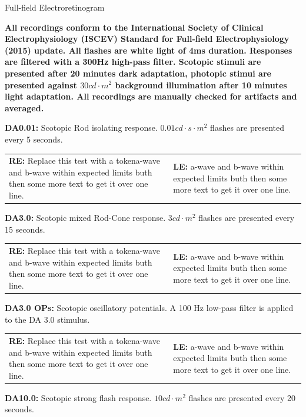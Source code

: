 \documentclass[12pt]{article}
\newenvironment{heading}
{\begin{flushleft}
	 \begin{large}
	\bfseries
}
{\end{large}
	\end{flushleft}
}
\newenvironment{boxed}
{\noindent\begin{lrbox}{\mybox}\begin{minipage}{\textwidth}}
{\end{minipage}\end{lrbox}\fbox{\usebox{\mybox}}}
\begin{document}
\begin{boxed}
\begin{heading}
Full-field Electroretinogram
\end{heading}

{\footnotesize{\textbf{All recordings conform to the International Society of Clinical Electrophysiology (ISCEV) Standard for Full-field Electrophysiology (2015) update. All flashes are white light of 4ms duration. Responses are filtered with a 300Hz high-pass filter. Scotopic stimuli are presented after 20 minutes dark adaptation, photopic stimui are presented against $30 cd{\cdot}m^2$ background illumination after 10 minutes light adaptation. All recordings are manually checked for artifacts and averaged.}}}\newline

\textbf{DA0.01:} Scotopic Rod isolating response. $0.01 cd{\cdot}s{\cdot}m^2$ flashes are presented every 5 seconds.\newline
		\begin{tabularx}{\linewidth}{X X}
			\textbf{RE:} Replace this test with a tokena-wave and b-wave within expected limits buth then some more text to get it over one line. & \textbf{LE:} a-wave and b-wave within expected limits buth then some more text to get it over one line.\\
		\end{tabularx}
\textbf{DA3.0:} Scotopic mixed Rod-Cone response. $3 cd{\cdot}m^2$ flashes are presented every 15 seconds.\newline
		\begin{tabularx}{\linewidth}{X X}
			\textbf{RE:} Replace this test with a tokena-wave and b-wave within expected limits buth then some more text to get it over one line. & \textbf{LE:} a-wave and b-wave within expected limits buth then some more text to get it over one line.\\
		\end{tabularx}
\textbf{DA3.0 OPs:} Scotopic oscillatory potentials. A 100 Hz low-pass filter is applied to the DA 3.0 stimulus.\newline
		\begin{tabularx}{\linewidth}{X X}
			\textbf{RE:} Replace this test with a tokena-wave and b-wave within expected limits buth then some more text to get it over one line. & \textbf{LE:} a-wave and b-wave within expected limits buth then some more text to get it over one line.\\
		\end{tabularx}
\textbf{DA10.0:} Scotopic strong flash response. $10 cd{\cdot}m^2$ flashes are presented every 20 seconds.\newline

\end{boxed}
\end{document}
